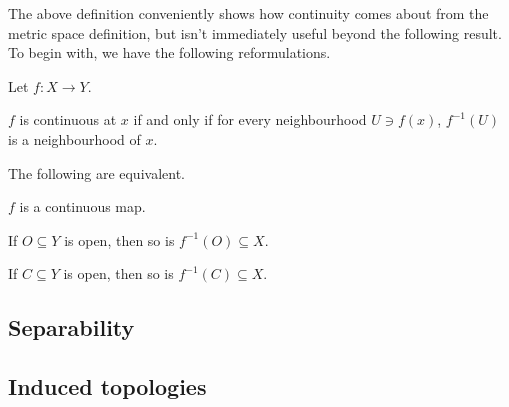 \documentclass[11pt]{article}
\begin{document}
The above definition conveniently shows how continuity comes about from the metric space definition, but isn't immediately useful beyond the following result. To begin with, we have the following reformulations.
\begin{proposition}
    Let $f : X \to Y$.
    \begin{enum}
        \item $f$ is continuous at $x$ if and only if for every neighbourhood $U \ni f(x)$, $f^{-1}(U)$ is a neighbourhood of $x$.
        \item The following are equivalent.
        \begin{enum2}
            \item $f$ is a continuous map.
            \item If $O \subseteq Y$ is open, then so is $f^{-1}(O) \subseteq X$.
            \item If $C \subseteq Y$ is open, then so is $f^{-1}(C) \subseteq X$.
        \end{enum2}
    \end{enum}
\end{proposition}











\subsection{Separability}

\subsection{Induced topologies}

\end{document}
